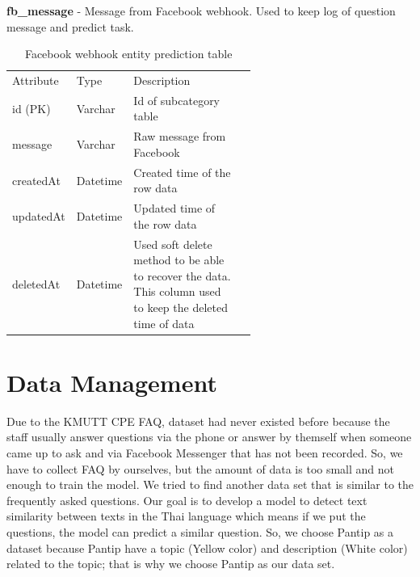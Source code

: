 \documentclass[12pt,oneside,openright,a4paper]{cpe-english-project}
\begin{document}
\textbf{fb\_message} - Message from Facebook webhook. Used to keep log of question message and predict task.
\begin{table}[ht]
	\caption{Facebook webhook entity prediction table}
	\label{tab:Facebook webhook entity prediction table}
\begin{adjustbox}{width=\textwidth}
\begin{tabular}{llp{0.6\linewidth}l}
\rowcolor[HTML]{5B9BD5} 
Attribute & Type     & Description                                                                                                 \\
\rowcolor[HTML]{DEEAF6} 
id (PK)   & Varchar  & Id of subcategory table                                                                                     \\
message   & Varchar  & Raw message from Facebook                                                                                   \\
\rowcolor[HTML]{DEEAF6} 
createdAt & Datetime & Created time of the row data                                                                                \\
updatedAt & Datetime & Updated time of the row   data                                                                              \\
\rowcolor[HTML]{DEEAF6} 
deletedAt & Datetime & Used soft delete method to be able to recover the data. This column   used to keep the deleted time of data
\end{tabular}
\end{adjustbox}
\end{table}

\pagebreak

\section{Data Management}
Due to the KMUTT CPE FAQ, dataset had never existed before because the staff usually answer questions via the phone or answer by themself when someone came up to ask and via Facebook Messenger that has not been recorded. So, we have to collect FAQ by ourselves, but the amount of data is too small and not enough to train the model. We tried to find another data set that is similar to the frequently asked questions. Our goal is to develop a model to detect text similarity between texts in the Thai language which means if we put the questions, the model can predict a similar question. So, we choose Pantip as a dataset because Pantip have a topic (Yellow color) and description (White color) related to the topic; that is why we choose Pantip as our data set.
\end{document}
